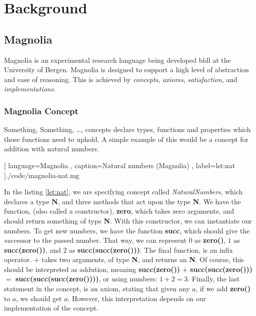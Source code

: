 \chapter{Background} \label{cha:background}

\section{Magnolia}

Magnolia is an experimental research language being developed \gls{bldl} at the
University of Bergen. Magnolia is designed to support a high level of
abstraction and ease of reasoning. This is achieved by \textit{concepts},
\textit{axioms}, \textit{satisfaction}, and \textit{implementations}.

\subsection{Magnolia Concept}

Something, Something, \dots, concepts declare types, functions and properties
which those functions need to uphold. A simple example of this would be a
concept for addition with natural numbers.

\begin{center}
  
    [ language=Magnolia
    , caption={Natural numbers (Magnolia)}
    , label=lst:nat
    ]{./code/magnolia-nat.mg}
\end{center}

In the listing \ref{lst:nat}, we are specifying concept called
\textit{NaturalNumbers}, which declares a type \textbf{N}, and three methods
that act upon the type \textbf{N}. We have the function, (also called a
constructor), \textbf{zero}, which takes zero arguments, and should return
something of type \textbf{N}. With this constructor, we can instantiate our
numbers. To get new numbers, we have the function \textbf{succ}, which should
give the \textit{succ}essor to the passed number. That way, we can represent $0$
as \textbf{zero()}, $1$ as \textbf{succ(zero())}, and $2$ as
\textbf{succ(succ(zero()))}. The final function, is an infix operator. $+$ takes
two arguments, of type \textbf{N}, and returns an \textbf{N}. Of course, this
should be interpreted as addution, meaning \textbf{succ(zero())} $+$
\textbf{succ(succ(zero()))} $=$ \textbf{succ(succ(succ(zero())))}, or using
numbers: $1 + 2 = 3$. Finally, the last statement in the concept, is an axiom,
stating that given any $a$, if we add \textbf{zero()} to $a$, we should get $a$.
However, this interpretation depends on our implementation
of the concept.

